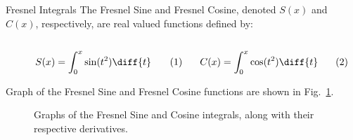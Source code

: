         \begin{ldefinition}{Fresnel Integrals}
            The Fresnel Sine and Fresnel Cosine, denoted
            $S(x)$ and $C(x)$, respectively, are real valued
            functions defined by:
            \par\hfill\par
            \vspace{-1ex}
            \begin{subequations}
                \begin{minipage}{0.49\textwidth}
                    \begin{equation}
                        S(x)=\int_{0}^{x}
                        \sin(t^{2})\diff{t}
                    \end{equation}
                \end{minipage}
                \hfill
                \begin{minipage}{0.49\textwidth}
                    \begin{equation}
                        C(x)=\int_{0}^{x}
                        \cos(t^{2})\diff{t}
                    \end{equation}
                \end{minipage}
            \end{subequations}
            \par
        \end{ldefinition}
        Graph of the Fresnel Sine and Fresnel Cosine
        functions are shown in
        Fig.~\ref{fig:Diff_Theory_Graphs_of_Sinx2_and_Cosx2}.
        \begin{figure}[H]
            \captionsetup{type=figure}
            \centering
            \begin{subfigure}[b]{0.49\textwidth}
                \centering
                \resizebox{\textwidth}{!}{%
                    
                }
            \end{subfigure}
            \begin{subfigure}[b]{0.49\textwidth}
                \centering
                \resizebox{\textwidth}{!}{%
                    
                }
            \end{subfigure}
            \caption[Fresnel Integrals]
                {Graphs of the Fresnel Sine and Cosine
                 integrals, along with their respective derivatives.}
            \label{fig:Diff_Theory_Graphs_of_Sinx2_and_Cosx2}
        \end{figure}
